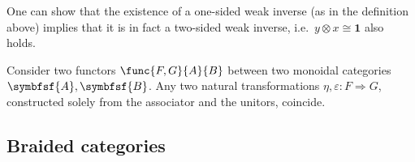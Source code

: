     \begin{remark}
        One can show that the existence of a one-sided weak inverse (as in the definition above) implies that it is in fact a two-sided weak inverse, i.e.~$y\otimes x\cong\symbf{1}$ also holds.
    \end{remark}

    \begin{theorem}
        Consider two functors $\func{F,G}{A}{B}$ between two monoidal categories $\symbfsf{A},\symbfsf{B}$. Any two natural transformations $\eta,\varepsilon:F\Rightarrow G$, constructed solely from the associator and the unitors, coincide.
    \end{theorem}

\subsection{Braided categories}

